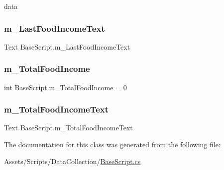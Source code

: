 data 

\mbox{\label{class_base_script_a9419c1f90813272da7e7d5e971fe63c2}} 
\subsubsection{\texorpdfstring{m\_LastFoodIncomeText}{m\_LastFoodIncomeText}}
{\footnotesize\ttfamily Text Base\+Script.\+m\+\_\+\+Last\+Food\+Income\+Text}

\mbox{\label{class_base_script_a68c475358c96c7388c6b9c6cacd38d80}} 
\subsubsection{\texorpdfstring{m\_TotalFoodIncome}{m\_TotalFoodIncome}}
{\footnotesize\ttfamily int Base\+Script.\+m\+\_\+\+Total\+Food\+Income = 0\hspace{0.3cm}{\ttfamily [static]}}

\mbox{\label{class_base_script_ab463c1146298cbf111dd9fe29722aaa0}} 
\subsubsection{\texorpdfstring{m\_TotalFoodIncomeText}{m\_TotalFoodIncomeText}}
{\footnotesize\ttfamily Text Base\+Script.\+m\+\_\+\+Total\+Food\+Income\+Text}



The documentation for this class was generated from the following file\+:\begin{DoxyCompactItemize}
\item 
Assets/\+Scripts/\+Data\+Collection/\mbox{\hyperlink{_base_script_8cs}{Base\+Script.\+cs}}\end{DoxyCompactItemize}
